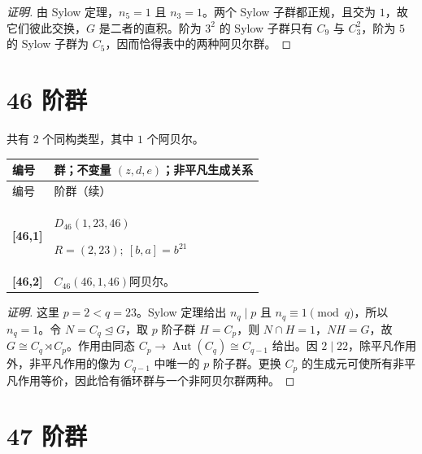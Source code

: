 \documentclass[UTF8,fontset=fandol,11pt,a4paper]{ctexart}
\newcommand{\Aut}{\operatorname{Aut}}\newcommand{\GL}{\operatorname{GL}}\newcommand{\ord}{\operatorname{ord}}\newcommand{\Z}{\mathrm Z}
\begin{document}
\begin{proof}[证明]
由 Sylow 定理，$n_{5}=1$ 且 $n_{3}=1$。两个 Sylow 子群都正规，且交为 $1$，故它们彼此交换，$G$ 是二者的直积。阶为 $3^2$ 的 Sylow 子群只有 $C_{9}$ 与 $C_{3}^2$，阶为 $5$ 的 Sylow 子群为 $C_{5}$，因而恰得表中的两种阿贝尔群。
\end{proof}

\section*{46 阶群}\label{order:46}

共有 $2$ 个同构类型，其中 $1$ 个阿贝尔。

\begingroup\small\setlength{\tabcolsep}{3pt}\renewcommand{\arraystretch}{1.12}

\begin{longtable}{@{}p{17mm}>{\raggedright\arraybackslash}p{141mm}@{}}

\toprule 编号 & 群；不变量 $(z,d,e)$；非平凡生成关系\\\midrule\endfirsthead

\toprule 编号 & 46 阶群（续）\\\midrule\endhead\bottomrule\endfoot

\textbf{[46,1]} & $D_{46}$\quad $(1,23,46)$\par\(R=(2,23);\allowbreak\ [b,a]=b^{21}\)\\[3pt]

\textbf{[46,2]} & $C_{46}$\quad $(46,1,46)$\quad 阿贝尔。\\[3pt]

\end{longtable}\endgroup

\begin{proof}[证明]
这里 $p=2<q=23$。Sylow 定理给出 $n_q\mid p$ 且 $n_q\equiv1\pmod q$，所以 $n_q=1$。令 $N=C_q\trianglelefteq G$，取 $p$ 阶子群 $H=C_p$，则 $N\cap H=1$，$NH=G$，故 $G\cong C_q\rtimes C_p$。作用由同态 $C_p\to\Aut(C_q)\cong C_{q-1}$ 给出。因 $2\mid 22$，除平凡作用外，非平凡作用的像为 $C_{q-1}$ 中唯一的 $p$ 阶子群。更换 $C_p$ 的生成元可使所有非平凡作用等价，因此恰有循环群与一个非阿贝尔群两种。
\end{proof}

\section*{47 阶群}\label{order:47}
\end{document}
